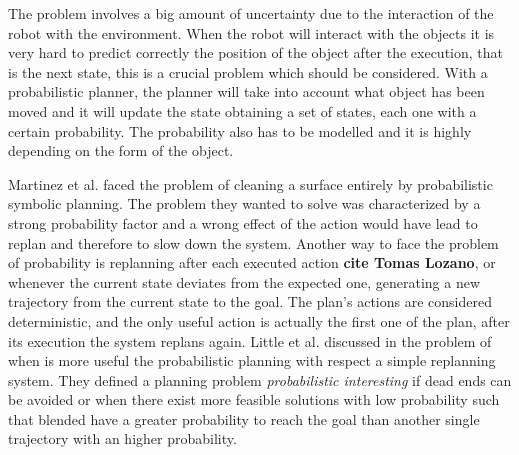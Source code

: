 The problem involves a big amount of uncertainty due to the interaction of the robot with the environment. When the robot will interact with the objects it is very hard to predict correctly the position of the object after the execution, that is the next state, this is a crucial problem which should be considered. With a probabilistic planner, the planner will take into account what object has been moved and it will update the state obtaining a set of states, each one with a certain probability. The probability also has to be modelled and it is highly depending on the form of the object.

Martinez et al. \citep{martinez2015planning} faced the problem of cleaning a surface entirely by probabilistic symbolic planning. The problem they wanted to solve was characterized by a strong probability factor and a wrong effect of the action would have lead to replan and therefore to slow down the system.
Another way to face the problem of probability is replanning after each executed action \textbf{cite Tomas Lozano}, or whenever the current state deviates from the expected one, generating a new trajectory from the current state to the goal. The plan's actions are considered deterministic, and the only useful action is actually the first one of the plan, after its execution the system replans again. Little et al. discussed in \cite{little2007probabilistic} the problem of when is more useful the probabilistic planning with respect a simple replanning system. 
They defined a planning problem \textit{probabilistic interesting} if dead ends can be avoided or when there exist more feasible solutions with low probability such that blended have a greater probability to reach the goal than another single trajectory with an higher probability.

